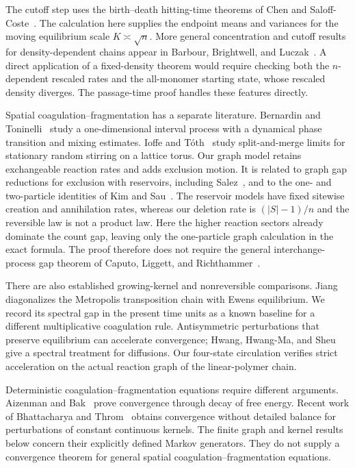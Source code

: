 The cutoff step uses the birth--death hitting-time theorems of Chen
and Saloff-Coste~\cite{CSC2015}. The calculation here supplies the
endpoint means and variances for the moving equilibrium scale
$K\asymp\sqrt n$. More general concentration and cutoff results for
density-dependent chains appear in Barbour, Brightwell, and
Luczak~\cite{BBL2022,BBL2026}. A direct application of a
fixed-density theorem would require checking both the
$n$-dependent rescaled rates and the all-monomer starting state,
whose rescaled density diverges. The passage-time proof handles
these features directly.

Spatial coagulation--fragmentation has a separate literature.
Bernardin and Toninelli~\cite{BernardinToninelli2012} study a
one-dimensional interval process with a dynamical phase transition
and mixing estimates. Ioffe and T\'oth~\cite{IoffeToth2020} study
split-and-merge limits for stationary random stirring on a lattice
torus. Our graph model retains exchangeable
reaction rates and adds exclusion motion. It is related to graph
gap reductions for exclusion with reservoirs, including
Salez~\cite{Salez2023,Salez2024}, and to the one- and two-particle
identities of Kim and Sau~\cite{KimSau2026}. The reservoir models
have fixed sitewise creation and annihilation rates, whereas our
deletion rate is $(|S|-1)/n$ and the reversible law is not a product
law. Here the higher reaction sectors already dominate the count
gap, leaving only the one-particle graph calculation in the exact
formula. The proof therefore does not require the general
interchange-process gap theorem of Caputo, Liggett, and
Richthammer~\cite{CaputoLiggettRichthammer2010}.

There are also established growing-kernel and nonreversible
comparisons. Jiang~\cite{Jiang2015} diagonalizes the Metropolis
transposition chain with Ewens equilibrium. We record its spectral
gap in the present time units as a known baseline for a different
multiplicative coagulation rule. Antisymmetric perturbations that
preserve equilibrium can accelerate convergence; Hwang, Hwang-Ma,
and Sheu~\cite{HwangHwangMaSheu2005} give a spectral treatment for
diffusions. Our four-state circulation verifies strict acceleration
on the actual reaction graph of the linear-polymer chain.

Deterministic coagulation--fragmentation equations require different
arguments. Aizenman and Bak~\cite{AizenmanBak1979} prove convergence
through decay of free energy. Recent work of Bhattacharya and
Throm~\cite{BhattacharyaThrom2026} obtains convergence without
detailed balance for perturbations of constant continuous kernels.
The finite graph and kernel results below concern their explicitly
defined Markov generators. They do not supply a convergence theorem
for general spatial coagulation--fragmentation equations.
